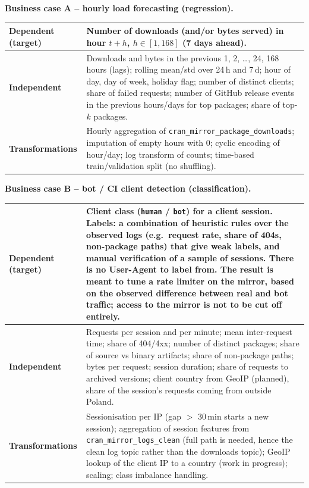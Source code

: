 \documentclass[11pt,a4paper]{article}
\newcommand{\hd}[1]{\par\Needspace{7\baselineskip}\medskip\noindent\textbf{#1}\par\nopagebreak\smallskip}
\begin{document}
\hd{Business case A -- hourly load forecasting (regression).}
\begin{center}
\centering\small
\begin{tabularx}{\textwidth}{@{}L{3.2cm}Y@{}}
\toprule
\textbf{Dependent (target)} & Number of downloads (and/or bytes served) in hour $t+h$, $h \in [1,168]$ (7 days ahead). \\
\midrule
\textbf{Independent} &
  Downloads and bytes in the previous 1, 2, \ldots, 24, 168 hours (lags); rolling mean/std over 24\,h and 7\,d;
  hour of day, day of week, holiday flag; number of distinct clients; share of failed requests;
  number of GitHub release events in the previous hours/days for top packages; share of top-$k$ packages. \\
\midrule
\textbf{Transformations} &
  Hourly aggregation of \texttt{cran\_\allowbreak{}mirror\_\allowbreak{}package\_\allowbreak{}downloads}; imputation of empty hours with 0;
  cyclic encoding of hour/day; log transform of counts; time-based train/validation split (no shuffling). \\
\bottomrule
\end{tabularx}
\end{center}

\hd{Business case B -- bot / CI client detection (classification).}
\begin{center}
\centering\small
\begin{tabularx}{\textwidth}{@{}L{3.2cm}Y@{}}
\toprule
\textbf{Dependent (target)} & Client class (\texttt{human} / \texttt{bot}) for a client session. Labels: a combination of heuristic rules over the observed logs (e.g.\ request rate, share of 404s, non-package paths) that give weak labels, and manual verification of a sample of sessions. There is no User-Agent to label from. The result is meant to tune a \textbf{rate limiter} on the mirror, based on the observed difference between real and bot traffic; access to the mirror is not to be cut off entirely. \\
\midrule
\textbf{Independent} &
  Requests per session and per minute; mean inter-request time; share of 404/4xx; number of distinct packages;
  share of source vs binary artifacts; share of non-package paths; bytes per request; session duration;
  share of requests to archived versions; client country from GeoIP (planned), share of the session's requests coming from outside Poland. \\
\midrule
\textbf{Transformations} &
  Sessionisation per IP (gap $>$ 30\,min starts a new session); aggregation of session features from
  \texttt{cran\_\allowbreak{}mirror\_\allowbreak{}logs\_\allowbreak{}clean} (full path is needed, hence the clean log topic rather than the downloads topic);
  GeoIP lookup of the client IP to a country (work in progress); scaling; class imbalance handling. \\
\bottomrule
\end{tabularx}
\end{center}
\end{document}
